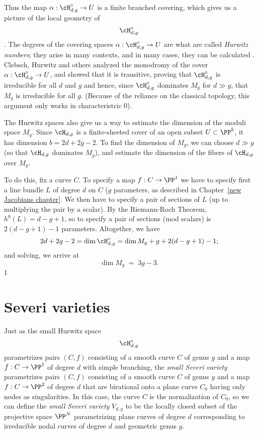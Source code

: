 Thus the map $\alpha : \cH^\circ_{d,g} \to U$ is a finite branched covering, which gives us a picture of the local geometry of $$\cH^\circ_{d,g}$$. 
The degrees of the covering spaces $\alpha : \cH^\circ_{d,g} \to U$ are what are called \emph{Hurwitz numbers}; they arise in many contexts, and in many cases, they can be calculated \cite{Graber-Vakil}. Clebsch, Hurwitz and others analyzed the monodromy of the cover $\alpha : \cH^\circ_{d,g} \to U$, and showed that it is transitive, proving that $\cH^\circ_{d,g}$ is irreducible for all $d$ and $g$ and hence, since $\cH^\circ_{d,g}$ dominates $M_g$ for $d \gg g$, that $M_g$ is irreducible for all $g$. (Because of the reliance on the classical topology, this argument only works in characteristric 0).


The Hurwitz spaces also give us a way to estimate the dimension of the moduli space $M_g$. Since $\cH_{d,g}$ is a finite-sheeted cover of an open subset $U \subset \PP^b$, it has dimension  $b = 2d+2g-2$. To find the dimension of $M_g$, we can choose $d \gg g$ (so that $\cH_{d,g}$ dominates $M_g$), and estimate the dimension of the fibers of $\cH_{d,g}$ over $M_g$.

To do this, fix a curve $C$. To specify a map $f : C \to \PP^1$ we have to specify first a line bundle $L$ of degree $d$ on $C$ ($g$ parameters, as described in Chapter~\ref{new Jacobians chapter}. We then have to specify a pair of sections of $L$ (up to multiplying the pair by a scalar). By the Riemann-Roch Theorem, $h^0(L) = d-g+1$, so to specify a pair of sections (mod scalars) is $2(d-g+1)-1$ parameters. Altogether, we have
$$
2d+2g-2 = \dim \cH^\circ_{d,g} = \dim M_g + g + 2(d-g+1)-1;
$$
and solving, we arrive at
$$
\dim M_g \; = \; 3g-3.
$$1

\section{Severi varieties}


Just as the small Hurwitz space $$\cH^\circ_{d,g}$$ parametrizes pairs $(C,f)$ consisting of a smooth curve $C$ of genus $g$ and a map $f : C \to \PP^1$ of degree $d$
with simple branching, the \emph{small Severi variety} parametrizes pairs $(C,f)$ consisting of a smooth curve $C$ of genus $g$ and a map $f : C \to \PP^2$ of degree $d$ that are birational onto a plane curve $C_0$ having only nodes as singularities. In this case, the curve $C$ is the normalization of $C_0$, so we can define the \emph{small Severi variety} $V_{d,g}$ to be the locally closed subset of the projective space $\PP^N$ parametrizing plane curves of degree $d$ corresponding to irreducible nodal curves of degree $d$ and geometric genus $g$.

